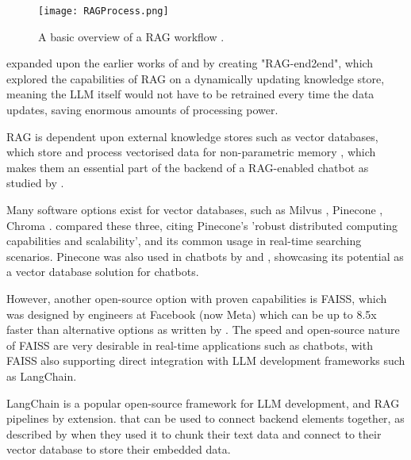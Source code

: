 \begin{figure}[H] 
    \centering
    \texttt{[image: RAGProcess.png]}
    \caption{A basic overview of a RAG workflow \autocite{openai_retrieval_nodate}.}
    \label{fig:RAGProcess}
\end{figure}

\textcite{siriwardhana_improving_2023} expanded upon the earlier works of \textcite{karpukhin_dense_2020} and \textcite{lewis_pre-training_2020} by creating 
"RAG-end2end", which explored the capabilities of RAG on a dynamically updating knowledge store, meaning the LLM itself would not have to be retrained 
every time the data updates, saving enormous amounts of processing power.

RAG is dependent upon external knowledge stores such as vector databases, which store and process vectorised data
for non-parametric memory \autocite{li_modernization_2023}, which makes them an essential part of the backend of 
a RAG-enabled chatbot as studied by \textcite{odede_jaybot_2024}. 

Many software options exist for
vector databases, such as Milvus \autocite{wang_milvus_2021}, Pinecone \autocite{pinecone_pinecone_nodate}, Chroma \autocite{chroma_chroma_nodate}.
\textcite{xie_brief_2023} compared these three, citing Pinecone's 'robust distributed computing capabilities and scalability', and its common usage 
in real-time searching scenarios. Pinecone was also used in chatbots by \textcite{odede_jaybot_2024} and \textcite{singer_development_2024}, showcasing its potential 
as a vector database solution for chatbots.

However, another open-source option with proven capabilities is FAISS, which was designed by engineers at Facebook (now Meta) which can be up to 8.5x faster than 
alternative options as written by \textcite{johnsonBillionscaleSimilaritySearch2017}. The speed and open-source nature of FAISS are very desirable in real-time 
applications such as chatbots, with FAISS also supporting direct integration with LLM development frameworks such as LangChain.

LangChain \autocite{langchain_introduction_nodate} is a popular open-source framework for LLM development, and RAG pipelines by extension. that can be used to connect backend elements 
together, as described by \textcite{singer_development_2024} when they used it to chunk their text data and connect to their vector database to store 
their embedded data. 


